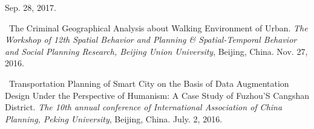 \begin{etaremune}
    Sep. 28, 2017.
    \invited
\item
    \Shaoqing\
    The Criminal Geographical Analysis about Walking Environment of Urban.
    \textit{The Workshop of 12th Spatial Behavior and Planning \& Spatial-Temporal Behavior and Social Planning Research, Beijing Union University}, Beijing, China.
    Nov. 27, 2016.
\item
    \Shaoqing\
    Transportation Planning of Smart City on the Basis of Data Augmentation Design Under the Perspective of Humanism: A Case Study of Fuzhou’S Cangshan District.
    \textit{The 10th annual conference of International Association of China Planning, Peking University}, Beijing, China.
    July. 2, 2016.
\end{etaremune}
